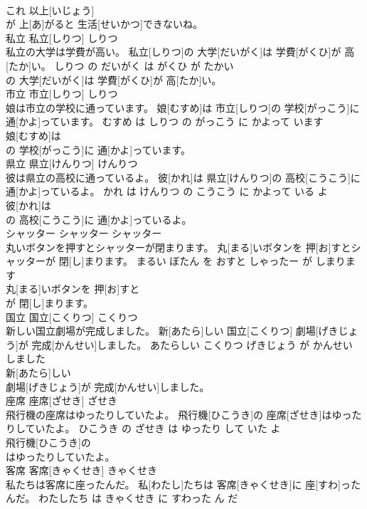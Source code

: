 \documentclass[8pt]{extreport}
\begin{document}
\begin{CJK}{UTF8}{min}
\\	これ 以上[いじょう]
\\	が 上[あ]がると 生活[せいかつ]できないね。			
\\	私立	私立[しりつ]	しりつ	
\\	私立の大学は学費が高い。	私立[しりつ]の 大学[だいがく]は 学費[がくひ]が 高[たか]い。	しりつ の だいがく は がくひ が たかい	
\\	の 大学[だいがく]は 学費[がくひ]が 高[たか]い。			
\\	市立	市立[しりつ]	しりつ	
\\	娘は市立の学校に通っています。	娘[むすめ]は 市立[しりつ]の 学校[がっこう]に 通[かよ]っています。	むすめ は しりつ の がっこう に かよって います	
\\	娘[むすめ]は
\\	の 学校[がっこう]に 通[かよ]っています。			
\\	県立	県立[けんりつ]	けんりつ	
\\	彼は県立の高校に通っているよ。	彼[かれ]は 県立[けんりつ]の 高校[こうこう]に 通[かよ]っているよ。	かれ は けんりつ の こうこう に かよって いる よ	
\\	彼[かれ]は
\\	の 高校[こうこう]に 通[かよ]っているよ。			
\\	シャッター	シャッター	シャッター	
\\	丸いボタンを押すとシャッターが閉まります。	丸[まる]いボタンを 押[お]すとシャッターが 閉[し]まります。	まるい ぼたん を おすと しゃったー が しまります	
\\	丸[まる]いボタンを 押[お]すと
\\	が 閉[し]まります。			
\\	国立	国立[こくりつ]	こくりつ	
\\	新しい国立劇場が完成しました。	新[あたら]しい 国立[こくりつ] 劇場[げきじょう]が 完成[かんせい]しました。	あたらしい こくりつ げきじょう が かんせい しました	
\\	新[あたら]しい
\\	劇場[げきじょう]が 完成[かんせい]しました。			
\\	座席	座席[ざせき]	ざせき	
\\	飛行機の座席はゆったりしていたよ。	飛行機[ひこうき]の 座席[ざせき]はゆったりしていたよ。	ひこうき の ざせき は ゆったり して いた よ	
\\	飛行機[ひこうき]の
\\	はゆったりしていたよ。			
\\	客席	客席[きゃくせき]	きゃくせき	
\\	私たちは客席に座ったんだ。	私[わたし]たちは 客席[きゃくせき]に 座[すわ]ったんだ。	わたしたち は きゃくせき に すわった ん だ	

\end{CJK}
\end{document}
